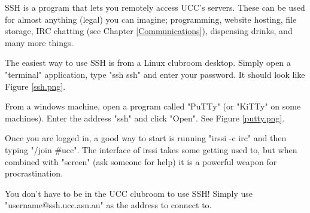 \begin{mdframed}

SSH is a program that lets you remotely access UCC's servers. These can be used for almost anything (legal) you can imagine; programming, website hosting, file storage, IRC chatting (see Chapter \ref{Communications}), dispensing drinks, and many more things.

The easiest way to use SSH is from a Linux clubroom desktop. Simply open a "terminal" application, type "ssh ssh" and enter your password. It should look like Figure \ref{ssh.png}.

From a windows machine, open a program called "PuTTy" (or "KiTTy" on some machines). Enter the address "ssh" and click "Open". See Figure \ref{putty.png}.

Once you are logged in, a good way to start is running "irssi -c irc" and then typing "/join \#ucc". The interface of irssi takes some getting used to, but when combined with "screen" (ask someone for help) it is a powerful weapon for procrastination.

You don't have to be in the UCC clubroom to use SSH! Simply use "username@ssh.ucc.asn.au" as the address to connect to.

\end{mdframed}

